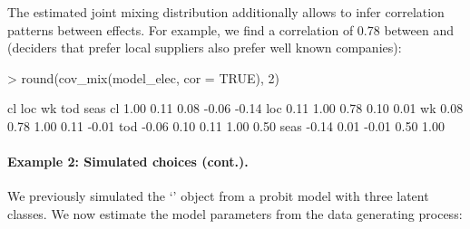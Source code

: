 \documentclass[article,shortnames]{jss}
\newcommand{\class}[1]{`\code{#1}'}
\begin{document}
The estimated joint mixing distribution additionally allows to infer correlation patterns between effects. For example, we find a correlation of 0.78 between  and  (deciders that prefer local suppliers also prefer well known companies):

\begin{Schunk}
\begin{Sinput}
> round(cov_mix(model_elec, cor = TRUE), 2)
\end{Sinput}
\begin{Soutput}
        cl  loc    wk   tod  seas
cl    1.00 0.11  0.08 -0.06 -0.14
loc   0.11 1.00  0.78  0.10  0.01
wk    0.08 0.78  1.00  0.11 -0.01
tod  -0.06 0.10  0.11  1.00  0.50
seas -0.14 0.01 -0.01  0.50  1.00
\end{Soutput}
\end{Schunk}

\paragraph{Example 2: Simulated choices (cont.).}

We previously simulated the \class{RprobitB\_data} object  from a probit model with three latent classes. We now estimate the model parameters from the data generating process:
\end{document}
